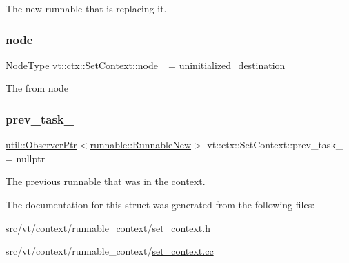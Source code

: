 The new runnable that is replacing it. 

\mbox{\label{structvt_1_1ctx_1_1_set_context_a2dbb72742d51cb57da427ab187edde74}} 
\subsubsection{\texorpdfstring{node\+\_\+}{node\_}}
{\footnotesize\ttfamily \hyperlink{namespacevt_a866da9d0efc19c0a1ce79e9e492f47e2}{Node\+Type} vt\+::ctx\+::\+Set\+Context\+::node\+\_\+ = uninitialized\+\_\+destination\hspace{0.3cm}{\ttfamily [private]}}

The from node \mbox{\label{structvt_1_1ctx_1_1_set_context_af5a9e9f7f2f7deeadd17da554e8aa39b}} 
\subsubsection{\texorpdfstring{prev\+\_\+task\+\_\+}{prev\_task\_}}
{\footnotesize\ttfamily \hyperlink{namespacevt_1_1util_a7d480434049896696b9a50c38a766202}{util\+::\+Observer\+Ptr}$<$\hyperlink{structvt_1_1runnable_1_1_runnable_new}{runnable\+::\+Runnable\+New}$>$ vt\+::ctx\+::\+Set\+Context\+::prev\+\_\+task\+\_\+ = nullptr\hspace{0.3cm}{\ttfamily [private]}}



The previous runnable that was in the context. 



The documentation for this struct was generated from the following files\+:\begin{DoxyCompactItemize}
\item 
src/vt/context/runnable\+\_\+context/\hyperlink{set__context_8h}{set\+\_\+context.\+h}\item 
src/vt/context/runnable\+\_\+context/\hyperlink{set__context_8cc}{set\+\_\+context.\+cc}\end{DoxyCompactItemize}
